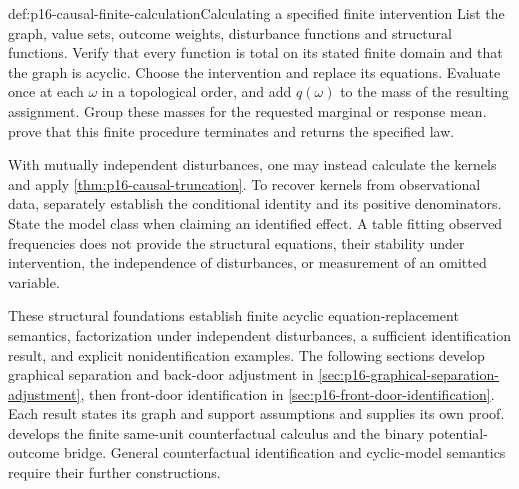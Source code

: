 \begin{hbmethod}{def:p16-causal-finite-calculation}{Calculating a specified finite intervention}
List the graph, value sets, outcome weights, disturbance functions and
structural functions. Verify that every function is total on its stated
finite domain and that the graph is acyclic. Choose the intervention and
replace its equations. Evaluate once at each \(\omega\) in a
topological order, and add \(q(\omega)\) to the mass of the resulting
assignment. Group these masses for the requested marginal or response
mean. 
prove that this finite procedure terminates and returns the specified law.

With mutually independent disturbances, one may instead calculate the
kernels and apply \cref{thm:p16-causal-truncation}. To recover kernels
from observational data, separately establish the conditional identity
and its positive denominators. State the model class when claiming an
identified effect. A table fitting observed frequencies does not provide
the structural equations, their stability under intervention, the
independence of disturbances, or measurement of an omitted variable.
\end{hbmethod}

These structural foundations establish finite acyclic equation-replacement
semantics, factorization under independent disturbances, a sufficient
identification result, and explicit nonidentification examples.
The following sections develop graphical separation and back-door
adjustment in \cref{sec:p16-graphical-separation-adjustment}, then
front-door identification in \cref{sec:p16-front-door-identification}.
Each result states its graph and support assumptions and supplies its
own proof.  develops the finite
same-unit counterfactual calculus and the binary potential-outcome bridge.
General counterfactual identification and cyclic-model semantics require
their further constructions.

